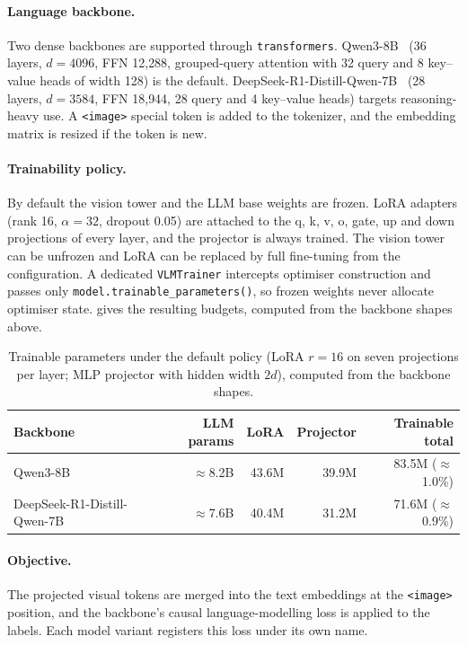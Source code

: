 \documentclass[11pt]{article}
\newcommand{\tok}[1]{\texttt{<#1>}}
\begin{document}
\paragraph{Language backbone.} Two dense backbones are supported through
\texttt{transformers}. Qwen3-8B~\cite{qwen3} (36 layers, $d=4096$, FFN 12{,}288, grouped-query
attention with 32 query and 8 key--value heads of width 128) is the default.
DeepSeek-R1-Distill-Qwen-7B~\cite{deepseekr1} (28 layers, $d=3584$, FFN 18{,}944, 28 query and
4 key--value heads) targets reasoning-heavy use. A \tok{image} special token is added to the
tokenizer, and the embedding matrix is resized if the token is new.

\paragraph{Trainability policy.} By default the vision tower and the LLM base weights are
frozen. LoRA adapters (rank 16, $\alpha=32$, dropout 0.05) are attached to the q, k, v, o,
gate, up and down projections of every layer, and the projector is always trained. The
vision tower can be unfrozen and LoRA can be replaced by full fine-tuning from the
configuration. A dedicated \texttt{VLMTrainer} intercepts optimiser construction and passes
only \texttt{model.trainable\_parameters()}, so frozen weights never allocate optimiser
state.  gives the resulting budgets, computed from the backbone shapes
above.

\begin{table}[t]
\centering
\caption{Trainable parameters under the default policy (LoRA $r=16$ on seven projections
per layer; MLP projector with hidden width $2d$), computed from the backbone shapes.}
\label{tab:budget}
\begin{tabular}{lrrrr}
\toprule
Backbone & LLM params & LoRA & Projector & Trainable total \\
\midrule
Qwen3-8B & $\approx$8.2B & 43.6M & 39.9M & 83.5M ($\approx$1.0\%) \\
DeepSeek-R1-Distill-Qwen-7B & $\approx$7.6B & 40.4M & 31.2M & 71.6M ($\approx$0.9\%) \\
\bottomrule
\end{tabular}
\end{table}

\paragraph{Objective.} The projected visual tokens are merged into the text embeddings at the
\tok{image} position, and the backbone's causal language-modelling loss is applied to the
labels. Each model variant registers this loss under its own name.
\end{document}
